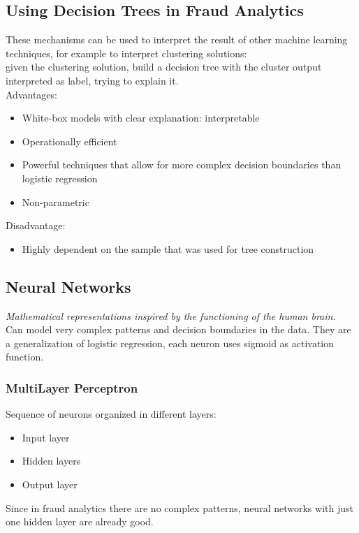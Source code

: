     \subsection{Using Decision Trees in Fraud Analytics}
        These mechanisms can be used to interpret the result of other machine learning techniques, for example to interpret clustering solutions:\\
        given the clustering solution, build a decision tree with the cluster output interpreted as label, trying to explain it.\\
        Advantages:
        \begin{itemize}
            \item White-box models with clear explanation: interpretable 
            \item Operationally efficient 
            \item Powerful techniques that allow for more complex decision boundaries than logistic regression 
            \item Non-parametric
        \end{itemize}
        Disadvantage:
        \begin{itemize}
            \item Highly dependent on the sample that was used for tree construction
        \end{itemize}
    \subsection{Neural Networks}
        \textit{Mathematical representations inspired by the functioning of the human brain}.\\
        Can model very complex patterns and decision boundaries in the data. They are a generalization of logistic regression, each neuron uses sigmoid as activation function.
        \subsubsection{MultiLayer Perceptron}
            Sequence of neurons organized in different layers:
            \begin{itemize}
                \item Input layer
                \item Hidden layers 
                \item Output layer 
            \end{itemize}
            Since in fraud analytics there are no complex patterns, neural networks with just one hidden layer are already good.
